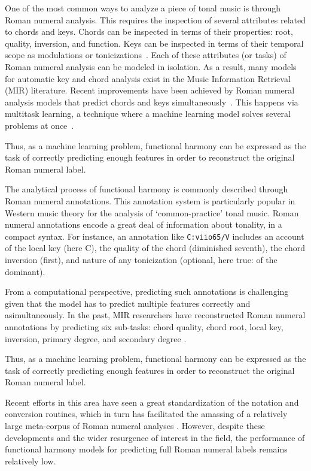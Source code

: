 

One of the most common ways to analyze a piece of tonal
music is through Roman numeral analysis. This requires the
inspection of several attributes related to chords and keys.
Chords can be inspected in terms of their properties: root,
quality, inversion, and function. Keys can be inspected in
terms of their temporal scope as modulations or
tonicizations~\cite{napoles_lopez_local_2020}. Each of these
attributes (or tasks) of Roman numeral analysis can be
modeled in isolation. As a result, many models for automatic
key and chord analysis exist in the Music Information
Retrieval (MIR) literature. Recent improvements have been
achieved by Roman numeral analysis models that predict
chords and keys simultaneously~\cite{chen_attend_2021,
micchi_not_2020}. This happens via multitask learning, a
technique where a machine learning model solves several
problems at once~\cite{ruder_overview_2017}.

Thus, as a machine learning problem, functional harmony can
be expressed as the task of correctly predicting enough
features in order to reconstruct the original Roman numeral
label.


The analytical process of functional harmony is commonly
described through Roman numeral annotations. This annotation
system is particularly popular in Western music theory for
the analysis of `common-practice' tonal music. Roman numeral
annotations encode a great deal of information about
tonality, in a compact syntax. For instance, an annotation
like  \texttt{C:viio65/V} includes an account of the local
key (here C), the quality of the chord (diminished seventh),
the chord inversion (first), and nature of any tonicization
(optional, here true: of the dominant).

From a computational perspective, predicting such
annotations is challenging given that the model has to
predict multiple features correctly and asimultaneously. In
the past, MIR researchers have reconstructed Roman numeral
annotations by predicting six sub-tasks: chord quality,
chord root, local key, inversion, primary degree, and
secondary degree \parencite{chen2018functional,
micchi2020not}.

Thus, as a machine learning problem, functional harmony can
be expressed as the task of correctly predicting enough
features in order to reconstruct the original Roman numeral
label.

Recent efforts in this area have seen a great
standardization of the notation and conversion routines,
\parencite{gotham2019romantext} which in turn has
facilitated the amassing of a relatively large meta-corpus
of Roman numeral analyses \parencite{gotham2019romantext}.
However, despite these developments and the wider resurgence
of interest in the field, the performance of functional
harmony models for predicting full Roman numeral labels
remains relatively low.

